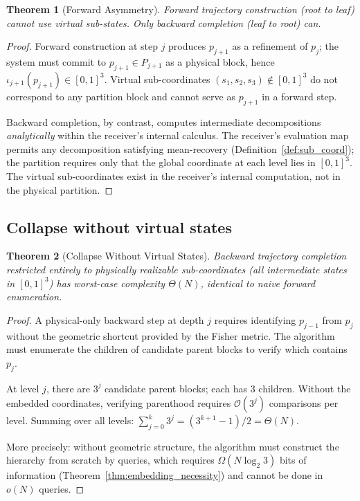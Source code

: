 \documentclass[twocolumn,10pt,a4paper]{article}
\theoremstyle{thmstyle}
\newtheorem{theorem}{Theorem}[section]
\theoremstyle{definition}
\theoremstyle{remark}
\begin{document}
\begin{theorem}[Forward Asymmetry]
\label{thm:forward_asymmetry}
Forward trajectory construction (root to leaf) cannot use virtual sub-states.
Only backward completion (leaf to root) can.
\end{theorem}

\begin{proof}
Forward construction at step $j$ produces $p_{j+1}$ as a refinement of $p_j$;
the system must commit to $p_{j+1} \in P_{j+1}$ as a physical block,
hence $\iota_{j+1}(p_{j+1}) \in [0,1]^3$.
Virtual sub-coordinates $(s_1,s_2,s_3) \notin [0,1]^3$ do not correspond
to any partition block and cannot serve as $p_{j+1}$ in a forward step.

Backward completion, by contrast, computes intermediate decompositions
\emph{analytically} within the receiver's internal calculus. The receiver's
evaluation map permits any decomposition satisfying mean-recovery
(Definition~\ref{def:sub_coord}); the partition requires only that
the global coordinate at each level lies in $[0,1]^3$.
The virtual sub-coordinates exist in the receiver's internal computation,
not in the physical partition.
\end{proof}

\subsection{Collapse without virtual states}

\begin{theorem}[Collapse Without Virtual States]
\label{thm:collapse}
Backward trajectory completion restricted entirely to physically realizable
sub-coordinates (all intermediate states in $[0,1]^3$) has worst-case
complexity $\Theta(N)$, identical to naive forward enumeration.
\end{theorem}

\begin{proof}
A physical-only backward step at depth $j$ requires identifying $p_{j-1}$
from $p_j$ without the geometric shortcut provided by the Fisher metric.
The algorithm must enumerate the children of candidate parent blocks to
verify which contains $p_j$.

At level $j$, there are $3^j$ candidate parent blocks; each has 3 children.
Without the embedded coordinates, verifying parenthood requires
$\mathcal{O}(3^j)$ comparisons per level. Summing over all levels:
$\sum_{j=0}^k 3^j = (3^{k+1}-1)/2 = \Theta(N)$.

More precisely: without geometric structure, the algorithm must construct
the hierarchy from scratch by queries, which requires $\Omega(N \log_2 3)$
bits of information (Theorem~\ref{thm:embedding_necessity}) and cannot be
done in $o(N)$ queries.
\end{proof}
\end{document}
